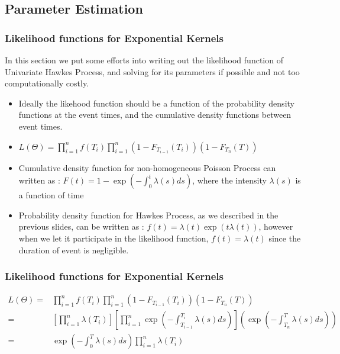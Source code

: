 \documentclass{beamer}
\begin{document}
\subsection{Parameter Estimation}
\begin{frame}
\frametitle{Likelihood functions for Exponential Kernels}
In this section we put some efforts into writing out the likelihood function of Univariate Hawkes Process, and solving for its parameters if possible and not too computationally costly.
\begin{itemize}
	\item Ideally the likehood function should be a function of the probability density functions at the event times, and the cumulative density functions between event times.
	\item $L(\Theta) = \prod_{i=1}^n f(T_{i}) \prod_{i=1}^n (1-F_{T_{i-1}}(T_i)) (1-F_{T_{n}}(T))$
	\item Cumulative density function for non-homogeneous Poisson Process can written as : $F(t) = 1 - \exp(-\int_0^t \lambda(s) ds)$, where the intensity $\lambda(s)$ is a function of time
	\item Probability density function for Hawkes Process, as we described in the previous slides, can be written as : $f(t) = \lambda(t) \exp(t\lambda(t))$, however when we let it participate in the likelihood function, $f(t) = \lambda(t)$ since the duration of event is negligible.
\end{itemize}
\end{frame}

\begin{frame}
\frametitle{Likelihood functions for Exponential Kernels}
\begin{equation*}
\begin{split}
L(\Theta) = &\prod_{i=1}^n f(T_{i}) \prod_{i=1}^n (1-F_{T_{i-1}}(T_i)) (1-F_{T_{n}}(T))\\
= &[\prod_{i=1}^n \lambda(T_{i})] [\prod_{i=1}^n \exp(-\int_{T_{i-1}}^{T_i} \lambda(s) ds)] (\exp(-\int_{T_{n}}^{T} \lambda(s) ds))\\
= &\exp(-\int_{0}^{T} \lambda(s) ds) \prod_{i=1}^n \lambda(T_{i})
\end{split}
\end{equation*}
\end{frame}
\end{document}
